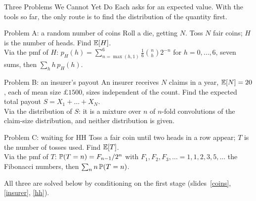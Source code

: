\begin{frame}{Three Problems We Cannot Yet Do}
  \small
  Each asks for an expected value. With the tools so far, the only route is to find the distribution of the quantity first.
  \begin{block}{Problem A: a random number of coins}
    Roll a die, getting $N$. Toss $N$ fair coins; $H$ is the number of heads. Find $\mathbb{E}[H]$.\\
    Via the pmf of $H$: $p_H(h)=\sum_{n=\max(h,1)}^{6}\tfrac16\binom nh2^{-n}$ for $h=0,\dots,6$, seven sums, then $\sum_h h\,p_H(h)$.
  \end{block}
  \begin{block}{Problem B: an insurer's payout}
    An insurer receives $N$ claims in a year, $\mathbb{E}[N]=20$, each of mean size $\pounds1500$, sizes independent of the count. Find the expected total payout $S=X_1+\dots+X_N$.\\
    Via the distribution of $S$: it is a mixture over $n$ of $n$-fold convolutions of the claim-size distribution, and neither distribution is given.
  \end{block}
  \begin{block}{Problem C: waiting for HH}
    Toss a fair coin until two heads in a row appear; $T$ is the number of tosses used. Find $\mathbb{E}[T]$.\\
    Via the pmf of $T$: $\mathbb{P}(T=n)=F_{n-1}/2^n$ with $F_1,F_2,F_3,\dots=1,1,2,3,5,\dots$ the Fibonacci numbers, then $\sum_n n\,\mathbb{P}(T=n)$.
  \end{block}
  All three are solved below by conditioning on the first stage (slides~\ref{coins}, \ref{insurer}, \ref{hh}).
\end{frame}

